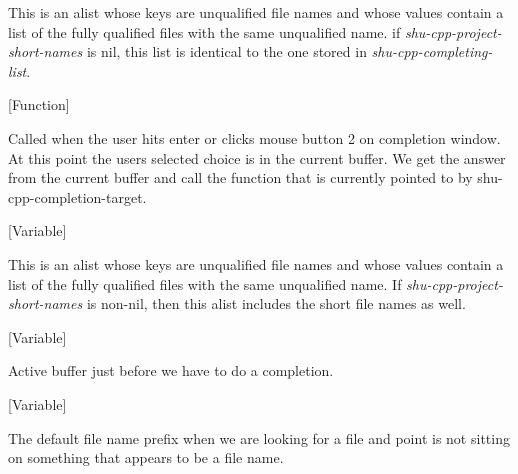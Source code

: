 \begin{doc-string}
This is an alist whose keys are unqualified file names and whose values
contain a list of the fully qualified files with the same unqualified name.  if
\emph{shu-cpp-project-short-names} is nil, this list is identical to the one stored in
\emph{shu-cpp-completing-list}.
\end{doc-string}

\vspace{1em}
\noindent
{}
\usebox{\funcname}
 \hfill [Function]

\begin{doc-string}
Called when the user hits enter or clicks mouse button 2 on completion window.
At this point the users selected choice is in the current buffer.  We get the
answer from the current buffer and call the function that is currently
pointed to by shu-cpp-completion-target.
\end{doc-string}

\vspace{1em}
\noindent
{}
\usebox{\funcname}
 \hfill [Variable]

\begin{doc-string}
This is an alist whose keys are unqualified file names and whose values
contain a list of the fully qualified files with the same unqualified name.  If
\emph{shu-cpp-project-short-names} is non-nil, then this alist includes the short file
names as well.
\end{doc-string}

\vspace{1em}
\noindent
{}
\usebox{\funcname}
 \hfill [Variable]

\begin{doc-string}
Active buffer just before we have to do a completion.
\end{doc-string}

\vspace{1em}
\noindent
{}
\usebox{\funcname}
 \hfill [Variable]

\begin{doc-string}
The default file name prefix when we are looking for a file and point is not
sitting on something that appears to be a file name.
\end{doc-string}

